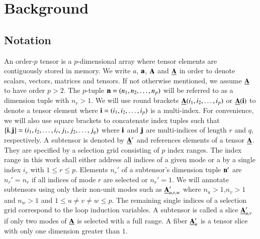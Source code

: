 \section{Background}
\label{sec:preliminaries}

\subsection{Notation}
\label{sec:preliminaries:notation}
An order-$p$ tensor is a $p$-dimensional array \cite{lim:2017:hypermatrices} where tensor elements are contiguously stored in memory. %
We write $a$, $\mathbf{a}$, $\mathbf{A}$ and $\underline{\mathbf{A}}$ in order to denote scalars, vectors, matrices and tensors. 
If not otherwise mentioned, we assume $\underline{\mathbf{A}}$ to have order $p>2$.
The $p$-tuple $\mathbf{n} = (n_1,n_2,\dots,n_p)$ will be referred to as a dimension tuple with $n_r>1$.
We will use round brackets $\underline{\mathbf{A}}(i_1,i_2,\dots,i_p)$ or $\underline{\mathbf{A}}(\mathbf{i})$ to denote a tensor element where $\mathbf{i} = (i_1,i_2,\dots,i_p)$ is a multi-index.
For convenience, we will also use square brackets to concatenate index tuples such that 
$[\mathbf{i},\mathbf{j}] = (i_1,i_2,\dots,i_r,\allowbreak j_1,j_2,\dots,j_q)$ where $\mathbf{i}$ and $\mathbf{j}$ are multi-indices of length $r$ and $q$, respectively.
A subtensor is denoted by $\underline{\mathbf{A}}'$ and references elements of a tensor $\underline{\mathbf{A}}$.
They are specified by a selection grid consisting of $p$ index ranges.
The index range in this work shall either address all indices of a given mode or a by a single index $i_r$ with $1 \leq r \leq p$. %
Elements $n_r'$ of a subtensor's dimension tuple $\mathbf{n}'$ are $n_r' = n_r$ if all indices of mode $r$ are selected or $n_r'=1$.
We will annotate subtensors using only their non-unit modes such as $\underline{\mathbf{A}}_{u,v,w}'$ where $n_u > 1$,$n_v > 1$ and $n_w >1$ and $1 \leq u \neq v \neq w \leq p$.
The remaining single indices of a selection grid correspond to the loop induction variables. 
A subtensor is called a slice $\underline{\mathbf{A}}_{u,v}'$ if only two modes of $\underline{\mathbf{A}}$ is selected with a full range.
A fiber $\underline{\mathbf{A}}_u'$ is a tensor slice with only one dimension greater than $1$.
\vspace{-1em}

